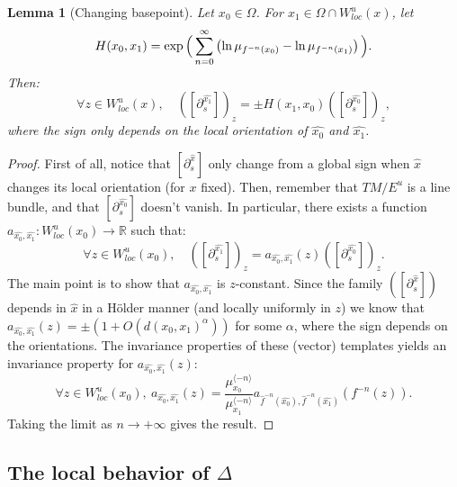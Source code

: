 \documentclass[a4paper]{article}
\newtheorem{lemma}[theorem]{Lemma}
\theoremstyle{definition}
\begin{document}
\begin{lemma}[Changing basepoint]\label{lem:basepoint}
Let $x_0 \in \Omega$. For $x_1 \in \Omega \cap W^u_{loc}(x)$, let $$H(x_0,x_1) = \exp\Big{(}\sum_{n=0}^\infty \left(\ln \mu_{f^{-n}(x_0)} - \ln \mu_{f^{-n}(x_1)} \right)\Big{)} .$$ Then:
$$\forall z \in W^u_{loc}(x), \quad ([\partial_s^{\widehat{x_1}}])_{z} = \pm H(x_1,x_0) ([\partial_s^{\widehat{x_0}}])_{z},$$
where the sign only depends on the local orientation of $\widehat{x_0}$ and $\widehat{x_1}$.
\end{lemma}

\begin{proof}
First of all, notice that $[\partial_s^{\widehat{x}}]$ only change from a global sign when $\widehat{x}$ changes its local orientation (for $x$ fixed).
Then, remember that $TM/E^u$ is a line bundle, and that $[\partial_s^{\widehat{x_0}}]$ doesn't vanish. In particular, there exists a function $a_{\widehat{x_0},\widehat{x_1}}:W^u_{loc}(x_0) \rightarrow \mathbb{R}$ such that:
$$ \forall z \in W^u_{loc}(x_0), \quad ([\partial_s^{\widehat{x_1}}])_{z} = a_{\widehat{x_0},\widehat{x_1}}(z) ([\partial_s^{\widehat{x_0}}])_{z} .$$
The main point is to show that $a_{\widehat{x_0},\widehat{x_1}}$ is $z$-constant. Since the family $([\partial_s^{\widehat{x}}])$ depends in $\widehat{x}$ in a Hölder manner (and locally uniformly in $z$) we know that $a_{\widehat{x_0},\widehat{x_1}}(z) = \pm (1 + O(d(x_0,x_1)^{\alpha}))$ for some $\alpha$, where the sign depends on the orientations. The invariance properties of these (vector) templates yields an invariance property for $a_{\widehat{x_0},\widehat{x_1}}(z)$:
$$ \forall z \in W^u_{loc}(x_0), \  a_{\widehat{x_0},\widehat{x_1}}(z) = \frac{\mu_{x_0}^{\langle - n \rangle}}{\mu_{x_1}^{\langle -n \rangle}} a_{\widehat{f}^{-n}(\widehat{x_0}),\widehat{f}^{-n}(\widehat{x_1})}(f^{-n}(z)).$$
Taking the limit as $n \rightarrow + \infty$ gives the result.
\end{proof}


\subsection{The local behavior of $\Delta$}\label{sec:locdelta}
\end{document}
